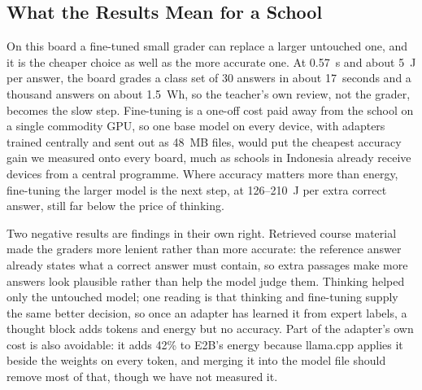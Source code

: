 \documentclass[journal]{IEEEtran}
\begin{document}
\subsection{What the Results Mean for a School}
On this board a fine-tuned small grader can replace a larger untouched one, and it is the cheaper choice as well as the more accurate one.
At 0.57~s and about 5~J per answer, the board grades a class set of 30 answers in about 17~seconds and a thousand answers on about 1.5~Wh, so the teacher's own review, not the grader, becomes the slow step.
Fine-tuning is a one-off cost paid away from the school on a single commodity GPU, so one base model on every device, with adapters trained centrally and sent out as 48~MB files, would put the cheapest accuracy gain we measured onto every board, much as schools in Indonesia already receive devices from a central programme.
Where accuracy matters more than energy, fine-tuning the larger model is the next step, at 126--210~J per extra correct answer, still far below the price of thinking.

Two negative results are findings in their own right.
Retrieved course material made the graders more lenient rather than more accurate: the reference answer already states what a correct answer must contain, so extra passages make more answers look plausible rather than help the model judge them.
Thinking helped only the untouched model; one reading is that thinking and fine-tuning supply the same better decision, so once an adapter has learned it from expert labels, a thought block adds tokens and energy but no accuracy.
Part of the adapter's own cost is also avoidable: it adds 42\% to E2B's energy because llama.cpp applies it beside the weights on every token, and merging it into the model file should remove most of that, though we have not measured it.
\end{document}
